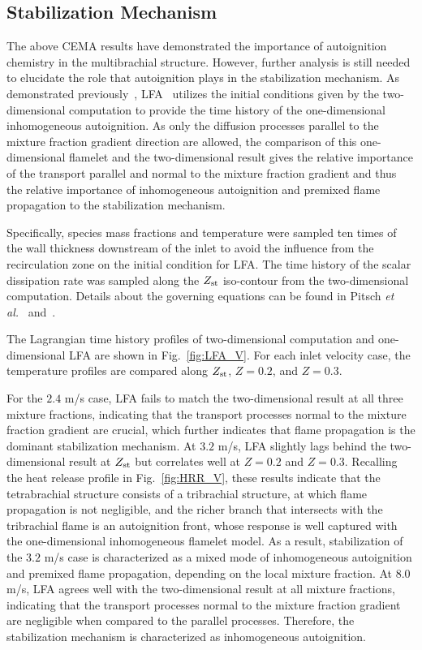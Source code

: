 \documentclass{wssci}
\begin{document}
\subsection{Stabilization Mechanism} 
The above CEMA results have demonstrated the importance of autoignition chemistry in the multibrachial structure.  However, further analysis is still needed to elucidate the role that autoignition plays in the stabilization mechanism.  As demonstrated previously~\cite{deng15}, LFA~\cite{pitsch98a} utilizes the initial conditions given by the two-dimensional computation to provide the time history of the one-dimensional inhomogeneous autoignition.  As only the diffusion processes parallel to the mixture fraction gradient direction are allowed, the comparison of this one-dimensional flamelet and the two-dimensional result gives the relative importance of the transport parallel and normal to the mixture fraction gradient and thus the relative importance of inhomogeneous autoignition and premixed flame propagation to the stabilization mechanism.

Specifically, species mass fractions and temperature were sampled ten times of the wall thickness downstream of the inlet to avoid the influence from the recirculation zone on the initial condition for LFA.  The time history of the scalar dissipation rate was sampled along the $Z_{\rm st}$ iso-contour from the two-dimensional computation.  Details about the governing equations can be found in Pitsch \emph{et al.}~\cite{pitsch98a} and~\cite{deng15}.

The Lagrangian time history profiles of two-dimensional computation and one-dimensional LFA are shown in Fig.~\ref{fig:LFA_V}.  For each inlet velocity case, the temperature profiles are compared along $Z_{\rm st}$, $Z = 0.2$, and $Z = 0.3$.  

For the $2.4$ m/s case, LFA fails to match the two-dimensional result at all three mixture fractions, indicating that the transport processes normal to the mixture fraction gradient are crucial, which further indicates that flame propagation is the dominant stabilization mechanism.  At $3.2$ m/s, LFA slightly lags behind the two-dimensional result at $Z_{\rm st}$ but correlates well at $Z = 0.2$ and $Z = 0.3$.  Recalling the heat release profile in Fig.~\ref{fig:HRR_V}, these results indicate that the tetrabrachial structure consists of a tribrachial structure, at which flame propagation is not negligible, and the richer branch that intersects with the tribrachial flame is an autoignition front, whose response is well captured with the one-dimensional inhomogeneous flamelet model.  As a result, stabilization of the $3.2$ m/s case is characterized as a mixed mode of inhomogeneous autoignition and premixed flame propagation, depending on the local mixture fraction.  At $8.0$ m/s, LFA agrees well with the two-dimensional result at all mixture fractions, indicating that the transport processes normal to the mixture fraction gradient are negligible when compared to the parallel processes.  Therefore, the stabilization mechanism is characterized as inhomogeneous autoignition.
\end{document}

